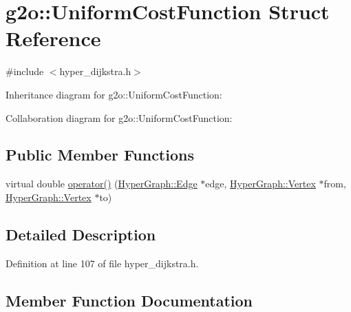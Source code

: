 \hypertarget{structg2o_1_1UniformCostFunction}{}\section{g2o\+:\+:Uniform\+Cost\+Function Struct Reference}
\label{structg2o_1_1UniformCostFunction}


{\ttfamily \#include $<$hyper\+\_\+dijkstra.\+h$>$}



Inheritance diagram for g2o\+:\+:Uniform\+Cost\+Function\+:


Collaboration diagram for g2o\+:\+:Uniform\+Cost\+Function\+:
\subsection*{Public Member Functions}
\begin{DoxyCompactItemize}
\item 
virtual double \hyperlink{structg2o_1_1UniformCostFunction_a44e15e4af4310890d4c7965cb6c7aaad}{operator()} (\hyperlink{classg2o_1_1HyperGraph_1_1Edge}{Hyper\+Graph\+::\+Edge} $\ast$edge, \hyperlink{classg2o_1_1HyperGraph_1_1Vertex}{Hyper\+Graph\+::\+Vertex} $\ast$from, \hyperlink{classg2o_1_1HyperGraph_1_1Vertex}{Hyper\+Graph\+::\+Vertex} $\ast$to)
\end{DoxyCompactItemize}


\subsection{Detailed Description}


Definition at line 107 of file hyper\+\_\+dijkstra.\+h.



\subsection{Member Function Documentation}
